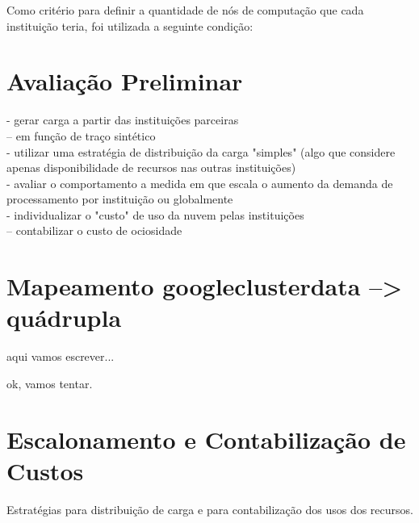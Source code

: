 \documentclass[tese,capa]{texufpel}
\begin{document}
Como critério para definir a quantidade de nós de computação que cada instituição teria, foi utilizada a seguinte condição:


\section{Avaliação Preliminar}

- gerar carga a partir das instituições parceiras\\
-- em função de traço sintético\\
- utilizar uma estratégia de distribuição da carga "simples" (algo que considere apenas disponibilidade de recursos nas outras instituições)\\
- avaliar o comportamento a medida em que escala o aumento da demanda de processamento por instituição ou globalmente\\
- individualizar o "custo" de uso da nuvem pelas instituições\\
-- contabilizar o custo de ociosidade\\

\section{Mapeamento googleclusterdata --> quádrupla}

aqui vamos escrever... 

ok, vamos tentar.

\section{Escalonamento e Contabilização de Custos}

Estratégias para distribuição de carga e para contabilização dos usos dos recursos.
\end{document}
